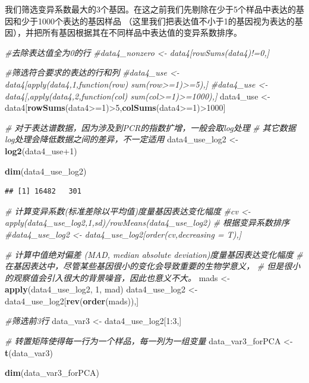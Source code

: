 \documentclass[]{article}
\newenvironment{Shaded}{\begin{snugshade}}{\end{snugshade}}
\newcommand{\KeywordTok}[1]{\textcolor[rgb]{0.13,0.29,0.53}{\textbf{{#1}}}}
\newcommand{\DecValTok}[1]{\textcolor[rgb]{0.00,0.00,0.81}{{#1}}}
\newcommand{\StringTok}[1]{\textcolor[rgb]{0.31,0.60,0.02}{{#1}}}
\newcommand{\CommentTok}[1]{\textcolor[rgb]{0.56,0.35,0.01}{\textit{{#1}}}}
\newcommand{\NormalTok}[1]{{#1}}
\numberwithin{figure}{section}
\numberwithin{table}{section}
\theoremstyle{definition}
\theoremstyle{definition}
\theoremstyle{definition}
\theoremstyle{remark}
\begin{document}
我们筛选变异系数最大的3个基因。在这之前我们先剔除在少于5个样品中表达的基因和少于1000个表达的基因样品
（这里我们把表达值不小于1的基因视为表达的基因），并把所有基因根据其在不同样品中表达值的变异系数排序。

\begin{Shaded}
\begin{Highlighting}[]
\CommentTok{#去除表达值全为0的行}
\CommentTok{#data4_nonzero <- data4[rowSums(data4)!=0,]}

\CommentTok{#筛选符合要求的表达的行和列}
\CommentTok{#data4_use <- data4[apply(data4,1,function(row) sum(row>=1)>=5),]}
\CommentTok{#data4_use <- data4[,apply(data4,2,function(col) sum(col>=1)>=1000),]}
\NormalTok{data4_use <-}\StringTok{ }\NormalTok{data4[}\KeywordTok{rowSums}\NormalTok{(data4>=}\DecValTok{1}\NormalTok{)>}\DecValTok{5}\NormalTok{,}\KeywordTok{colSums}\NormalTok{(data4>=}\DecValTok{1}\NormalTok{)>}\DecValTok{1000}\NormalTok{]}

\CommentTok{# 对于表达谱数据，因为涉及到PCR的指数扩增，一般会取log处理}
\CommentTok{# 其它数据log处理会降低数据之间的差异，不一定适用}
\NormalTok{data4_use_log2 <-}\StringTok{ }\KeywordTok{log2}\NormalTok{(data4_use}\DecValTok{+1}\NormalTok{)}

\KeywordTok{dim}\NormalTok{(data4_use_log2)}
\end{Highlighting}
\end{Shaded}

\begin{verbatim}
## [1] 16482   301
\end{verbatim}

\begin{Shaded}
\begin{Highlighting}[]
\CommentTok{# 计算变异系数(标准差除以平均值)度量基因表达变化幅度}
\CommentTok{#cv <- apply(data4_use_log2,1,sd)/rowMeans(data4_use_log2)}
\CommentTok{# 根据变异系数排序}
\CommentTok{#data4_use_log2 <- data4_use_log2[order(cv,decreasing = T),]}

\CommentTok{# 计算中值绝对偏差 (MAD, median absolute deviation)度量基因表达变化幅度}
\CommentTok{# 在基因表达中，尽管某些基因很小的变化会导致重要的生物学意义，}
\CommentTok{# 但是很小的观察值会引入很大的背景噪音，因此也意义不大。}
\NormalTok{mads <-}\StringTok{ }\KeywordTok{apply}\NormalTok{(data4_use_log2, }\DecValTok{1}\NormalTok{, mad)}
\NormalTok{data4_use_log2 <-}\StringTok{ }\NormalTok{data4_use_log2[}\KeywordTok{rev}\NormalTok{(}\KeywordTok{order}\NormalTok{(mads)),]}

\CommentTok{#筛选前3行}
\NormalTok{data_var3 <-}\StringTok{ }\NormalTok{data4_use_log2[}\DecValTok{1}\NormalTok{:}\DecValTok{3}\NormalTok{,]}

\CommentTok{# 转置矩阵使得每一行为一个样品，每一列为一组变量}
\NormalTok{data_var3_forPCA <-}\StringTok{ }\KeywordTok{t}\NormalTok{(data_var3)}

\KeywordTok{dim}\NormalTok{(data_var3_forPCA)}
\end{Highlighting}
\end{Shaded}
\end{document}
